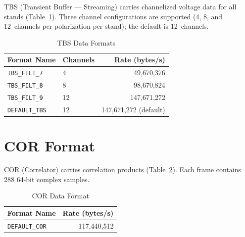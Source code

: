 TBS (Transient Buffer --- Streaming) carries channelized voltage data for all stands
(Table~\ref{tab:tbs-formats}).
Three channel configurations are supported (4, 8, and 12~channels per
polarization per stand); the default is 12~channels.

\begin{longtable}{l l r}
\caption{TBS Data Formats}
\label{tab:tbs-formats} \\
\toprule
\textbf{Format Name} & \textbf{Channels} & \textbf{Rate (bytes/s)} \\
\midrule
\endfirsthead
\endhead
\bottomrule
\endfoot

\texttt{TBS\_FILT\_7}  &  4 &  49,670,376 \\
\texttt{TBS\_FILT\_8}  &  8 &  98,670,824 \\
\texttt{TBS\_FILT\_9}  & 12 & 147,671,272 \\
\texttt{DEFAULT\_TBS}  & 12 & 147,671,272 (default) \\

\end{longtable}

\section{COR Format}

COR (Correlator) carries correlation products (Table~\ref{tab:cor-format}).  Each frame contains 288
64-bit complex samples.

\begin{longtable}{l r}
\caption{COR Data Format}
\label{tab:cor-format} \\
\toprule
\textbf{Format Name} & \textbf{Rate (bytes/s)} \\
\midrule
\endfirsthead
\endhead
\bottomrule
\endfoot

\texttt{DEFAULT\_COR} & 117,440,512 \\

\end{longtable}
